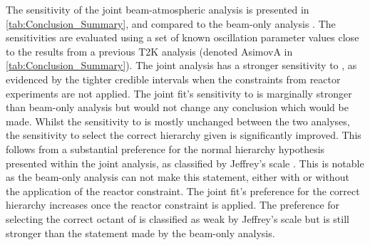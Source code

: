 
The sensitivity of the joint beam-atmospheric analysis is presented in \autoref{tab:Conclusion_Summary}, and compared to the beam-only analysis \cite{Dunne2020-uf}. The sensitivities are evaluated using a set of known oscillation parameter values close to the results from a previous T2K analysis \cite{PhysRevLett.112.181801} (denoted AsimovA in \autoref{tab:Conclusion_Summary}). The joint analysis has a stronger sensitivity to , as evidenced by the tighter \quickmath{1\sigma} credible intervals when the constraints from reactor experiments are not applied. The joint fit's sensitivity to  is marginally stronger than beam-only analysis but would not change any conclusion which would be made. Whilst the sensitivity to  is mostly unchanged between the two analyses, the sensitivity to select the correct hierarchy given is significantly improved. This follows from a substantial preference for the normal hierarchy hypothesis presented within the joint analysis, as classified by Jeffrey's scale \cite{Jeffreys:1939xee}. This is notable as the beam-only analysis can not make this statement, either with or without the application of the reactor constraint. The joint fit's preference for the correct hierarchy increases once the reactor constraint is applied. The preference for selecting the correct octant of  is classified as weak by Jeffrey's scale but is still stronger than the statement made by the beam-only analysis.


